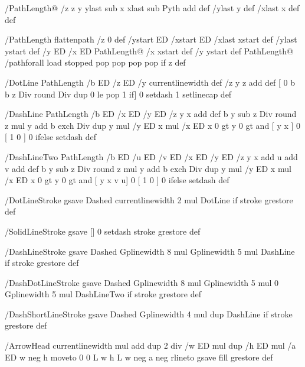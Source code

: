 /PathLength@ %
  {  
    /z   
    z  
    y ylast sub  
    x xlast sub  
    Pyth  
    add  
    def   
    /ylast y def  
    /xlast x def  
  } def  
      
  /PathLength  
  {  
    flattenpath  
    /z 0 def  
    { %
      /ystart ED  
      /xstart ED  
      /xlast xstart def  
      /ylast ystart def  
    }  
    { %
      /y ED  
      /x ED  
      PathLength@  
    }  
    { %
    }  
    { %
      /x xstart def  
      /y ystart def  
      PathLength@   
    }  
    /pathforall load  
    stopped {pop pop pop pop} if  
    z  
  } def  
    
 /DotLine   
 {  
   PathLength /b ED   
   /z ED   
   /y currentlinewidth def   
   /z y z add def   
   [ 0 b b z Div round Div dup 0 le { pop 1 } if] 0 setdash   
   1 setlinecap  
 } def  
  
 /DashLine   
  {  
    PathLength /b ED   
    /x ED   
    /y ED   
    /z y x add def   
    b y sub z Div round z mul y add b exch Div 
    dup  
    y mul /y ED   
    x mul /x ED   
    x 0 gt y 0 gt and   
    { [ y x ] 0 }  
    { [ 1 0 ] 0 }  
    ifelse  
    setdash  
  } def  
  
 /DashLineTwo 
  {  
    PathLength /b ED   
    /u ED 
    /v ED 
    /x ED   
    /y ED 
    /z y x add u add v add def   
    b y sub z Div round z mul y add b exch Div 
    dup  
    y mul /y ED   
    x mul /x ED   
    x 0 gt y 0 gt and   
    { [ y x v u] 0 }  
    { [ 1 0 ] 0 }  
    ifelse  
    setdash  
  } def  
      
  
 /DotLineStroke   
 {  
   gsave  
     Dashed {currentlinewidth 2 mul DotLine} if  
     stroke  
   grestore  
 } def  
    
 /SolidLineStroke  
 {  
   gsave  
     [] 0 setdash  
     stroke  
   grestore  
 } def  
    
 /DashLineStroke  
 {  
   gsave   
     Dashed {Gplinewidth 8 mul Gplinewidth 5 mul DashLine} if  
     stroke  
   grestore  
 } def  
   
 /DashDotLineStroke  
 {  
   gsave   
     Dashed {Gplinewidth 8 mul Gplinewidth 5 mul 0 Gplinewidth 5 mul DashLineTwo} if  
     stroke  
   grestore  
 } def  
    
 /DashShortLineStroke  
 {  
   gsave   
     Dashed {Gplinewidth 4 mul dup DashLine} if  
     stroke  
   grestore  
 } def  
    
 /ArrowHead  
 {   
   currentlinewidth mul add dup 2 div /w ED  
   mul dup /h ED  
   mul /a ED   
   w neg h moveto   
   0 0 L   
   w h L   
   w neg a neg rlineto   
   gsave fill grestore   
 } def  
    
